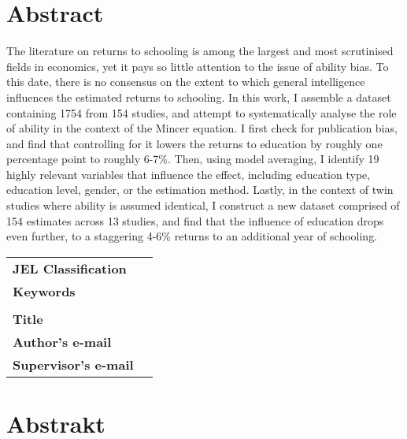 \section*{Abstract}

The literature on returns to schooling is among the largest and most scrutinised fields in economics, yet it pays so little attention to the issue of ability bias. To this date, there is no consensus on the extent to which general intelligence influences the estimated returns to schooling. In this work, I assemble a dataset containing 1754 from 154 studies, and attempt to systematically analyse the role of ability in the context of the Mincer equation. I first check for publication bias, and find that controlling for it lowers the returns to education by roughly one percentage point to roughly 6-7\%. Then, using model averaging, I identify 19 highly relevant variables that influence the effect, including education type, education level, gender, or the estimation method. Lastly, in the context of twin studies  where ability is assumed identical, I construct a new dataset comprised of 154 estimates across 13 studies, and find that the influence of education drops even further, to a staggering 4-6\% returns to an additional year of schooling.



\bigskip

\begin{tabular}{lp{8.6cm}}
	\textbf{JEL Classification}  & \JEL                                        \\
	\textbf{Keywords}            & \Keywords                                   \\
	                             &                                             \\
	\textbf{Title}               & \Bookname                                   \\
	\textbf{Author's e-mail}     & \texttt{\href{mailto:\Email}{\Email}}       \\
	\textbf{Supervisor's e-mail} & \texttt{\href{mailto:\EmailSup}{\EmailSup}} \\
\end{tabular}

\clearpage

\section*{Abstrakt}\label{abstract}

